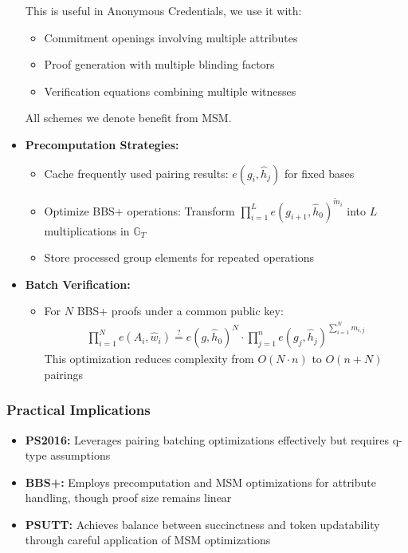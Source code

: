 \begin{itemize}
    This is useful in Anonymous Credentials, we use it with:
    \begin{itemize}
        \item Commitment openings involving multiple attributes
        \item Proof generation with multiple blinding factors
        \item Verification equations combining multiple witnesses
    \end{itemize}
    All schemes we denote benefit from MSM.
    
    \item \textbf{Precomputation Strategies:} 
    \begin{itemize}
        \item Cache frequently used pairing results: $e(g_i, \hat{h}_j)$ for fixed bases
        \item Optimize BBS+ operations: Transform $\prod_{i=1}^L e(g_{i+1}, \hat{h}_0)^{\tilde{m}_i}$ into $L$ multiplications in $\mathbb{G}_T$
        \item Store processed group elements for repeated operations
    \end{itemize}
    
    \item \textbf{Batch Verification:}
    \begin{itemize}
        \item For $N$ BBS+ proofs under a common public key:
        \begin{align*}
            \prod_{i=1}^N e(A_i, \hat{w}_i) \stackrel{?}{=} e(g, \hat{h}_0)^N \cdot \prod_{j=1}^n e(g_j, \hat{h}_j)^{\sum_{i=1}^N m_{i,j}}
        \end{align*}
        This optimization reduces complexity from $O(N \cdot n)$ to $O(n + N)$ pairings
    \end{itemize}
\end{itemize}

\subsubsection*{Practical Implications}
\begin{itemize}
    \item \textbf{PS2016:} Leverages pairing batching optimizations effectively but requires q-type assumptions
    \item \textbf{BBS+:} Employs precomputation and MSM optimizations for attribute handling, though proof size remains linear
    \item \textbf{PSUTT:} Achieves balance between succinctness and token updatability through careful application of MSM optimizations
\end{itemize}






